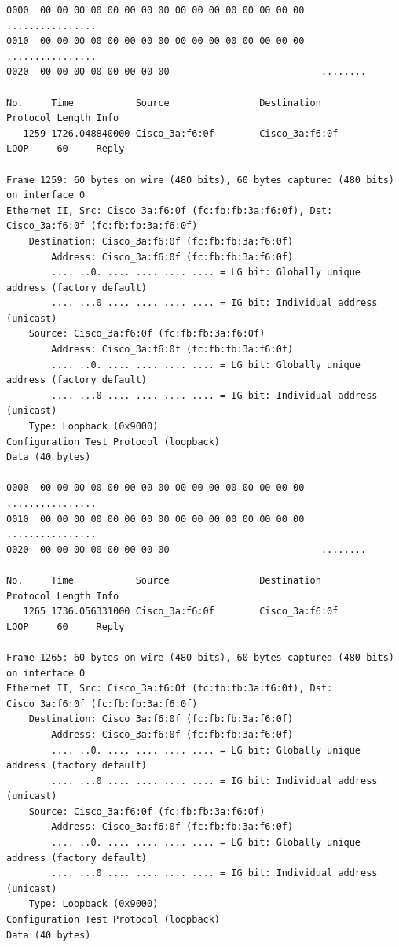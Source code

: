 \documentclass[a4paper,11pt]{article}
\begin{document}
\begin{lstlisting}
0000  00 00 00 00 00 00 00 00 00 00 00 00 00 00 00 00   ................
0010  00 00 00 00 00 00 00 00 00 00 00 00 00 00 00 00   ................
0020  00 00 00 00 00 00 00 00                           ........

No.     Time           Source                Destination           Protocol Length Info
   1259 1726.048840000 Cisco_3a:f6:0f        Cisco_3a:f6:0f        LOOP     60     Reply

Frame 1259: 60 bytes on wire (480 bits), 60 bytes captured (480 bits) on interface 0
Ethernet II, Src: Cisco_3a:f6:0f (fc:fb:fb:3a:f6:0f), Dst: Cisco_3a:f6:0f (fc:fb:fb:3a:f6:0f)
    Destination: Cisco_3a:f6:0f (fc:fb:fb:3a:f6:0f)
        Address: Cisco_3a:f6:0f (fc:fb:fb:3a:f6:0f)
        .... ..0. .... .... .... .... = LG bit: Globally unique address (factory default)
        .... ...0 .... .... .... .... = IG bit: Individual address (unicast)
    Source: Cisco_3a:f6:0f (fc:fb:fb:3a:f6:0f)
        Address: Cisco_3a:f6:0f (fc:fb:fb:3a:f6:0f)
        .... ..0. .... .... .... .... = LG bit: Globally unique address (factory default)
        .... ...0 .... .... .... .... = IG bit: Individual address (unicast)
    Type: Loopback (0x9000)
Configuration Test Protocol (loopback)
Data (40 bytes)

0000  00 00 00 00 00 00 00 00 00 00 00 00 00 00 00 00   ................
0010  00 00 00 00 00 00 00 00 00 00 00 00 00 00 00 00   ................
0020  00 00 00 00 00 00 00 00                           ........

No.     Time           Source                Destination           Protocol Length Info
   1265 1736.056331000 Cisco_3a:f6:0f        Cisco_3a:f6:0f        LOOP     60     Reply

Frame 1265: 60 bytes on wire (480 bits), 60 bytes captured (480 bits) on interface 0
Ethernet II, Src: Cisco_3a:f6:0f (fc:fb:fb:3a:f6:0f), Dst: Cisco_3a:f6:0f (fc:fb:fb:3a:f6:0f)
    Destination: Cisco_3a:f6:0f (fc:fb:fb:3a:f6:0f)
        Address: Cisco_3a:f6:0f (fc:fb:fb:3a:f6:0f)
        .... ..0. .... .... .... .... = LG bit: Globally unique address (factory default)
        .... ...0 .... .... .... .... = IG bit: Individual address (unicast)
    Source: Cisco_3a:f6:0f (fc:fb:fb:3a:f6:0f)
        Address: Cisco_3a:f6:0f (fc:fb:fb:3a:f6:0f)
        .... ..0. .... .... .... .... = LG bit: Globally unique address (factory default)
        .... ...0 .... .... .... .... = IG bit: Individual address (unicast)
    Type: Loopback (0x9000)
Configuration Test Protocol (loopback)
Data (40 bytes)


\end{lstlisting}
\end{document}
